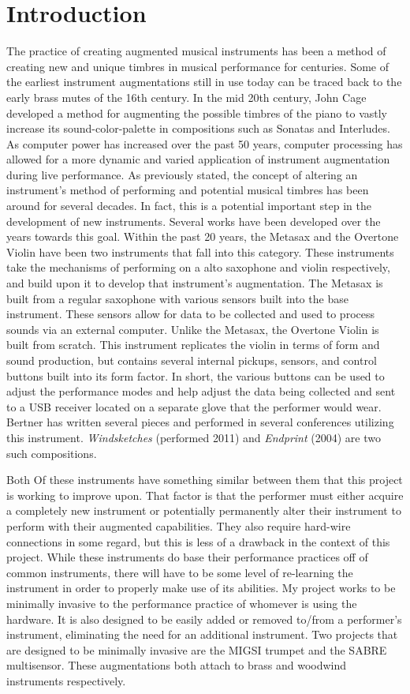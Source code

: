 \chapter{Introduction}
\label{chap:intro}
The practice of creating augmented musical instruments has been a method of creating new and unique timbres in musical performance for centuries. Some of the earliest instrument augmentations still in use today can be traced back to the early brass mutes of the 16th century. In the mid 20th century, John Cage developed a method for augmenting the possible timbres of the piano to vastly increase its sound-color-palette in compositions such as Sonatas and Interludes. 
As computer power has increased over the past 50 years,
computer processing has allowed for a more dynamic and varied application of instrument augmentation during live performance. As previously stated, the concept of altering an instrument’s method of performing and potential musical timbres has been around for several decades. In fact, this is a potential important step in the development of new instruments. 
Several works have been developed over the years towards this goal. Within the past 20 years, the Metasax and the Overtone Violin have been two instruments that fall into this category. These instruments take the mechanisms of performing on a alto saxophone and violin respectively, and build upon it to develop that instrument’s augmentation. The Metasax is built from a regular saxophone with various sensors built into the base instrument. These sensors allow for data to be collected and used to process sounds via an external computer. 
Unlike the Metasax, the Overtone Violin is built from scratch. This instrument replicates the violin in terms of form and sound production, but contains several internal pickups, sensors, and control buttons built into its form factor. In short, the various buttons can be used to adjust the performance modes and help adjust the data being collected and sent to a USB receiver located on a separate glove that the performer would wear. Bertner has written several pieces and performed in several conferences utilizing this instrument. \textit{Windsketches} (performed 2011) and \textit{Endprint} (2004) are two such compositions.

Both Of these instruments have something similar between them that this project is working to improve upon. That factor is that the performer must either acquire a completely new instrument or potentially permanently alter their instrument to perform with their augmented capabilities. They also require hard-wire connections in some regard, but this is less of a drawback in the context of this project. While these instruments do base their performance practices off of common instruments, there will have to be some level of re-learning the instrument in order to properly make use of its abilities. 
My project works to be minimally invasive to the performance practice of whomever is using the hardware. It is also designed to be easily added or removed to/from a performer’s instrument, eliminating the need for an additional instrument. Two projects that are designed to be minimally invasive are the MIGSI trumpet and the SABRE multisensor. These augmentations both attach to brass and woodwind instruments respectively. 

